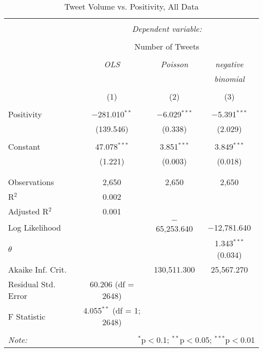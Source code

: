 \begin{table}[!htbp] \centering 
  \caption{Tweet Volume vs. Positivity, All Data} 
  \label{} 
    \begin{tabular}{@{\extracolsep{5pt}}lccc} 
    \\[-1.8ex]\hline 
    \hline \\[-1.8ex] 
     & \multicolumn{3}{c}{\textit{Dependent variable:}} \\ 
    \cline{2-4} 
    \\[-1.8ex] & \multicolumn{3}{c}{Number of Tweets} \\ 
    \\[-1.8ex] & \textit{OLS} & \textit{Poisson} & \textit{negative} \\ 
     & \textit{} & \textit{} & \textit{binomial} \\ 
    \\[-1.8ex] & (1) & (2) & (3)\\ 
    \hline \\[-1.8ex] 
     Positivity & $-$281.010$^{**}$ & $-$6.029$^{***}$ & $-$5.391$^{***}$ \\ 
      & (139.546) & (0.338) & (2.029) \\ 
      & & & \\ 
     Constant & 47.078$^{***}$ & 3.851$^{***}$ & 3.849$^{***}$ \\ 
      & (1.221) & (0.003) & (0.018) \\ 
      & & & \\ 
    \hline \\[-1.8ex] 
    Observations & 2,650 & 2,650 & 2,650 \\ 
    R$^{2}$ & 0.002 &  &  \\ 
    Adjusted R$^{2}$ & 0.001 &  &  \\ 
    Log Likelihood &  & $-$65,253.640 & $-$12,781.640 \\ 
    $\theta$ &  &  & 1.343$^{***}$  (0.034) \\ 
    Akaike Inf. Crit. &  & 130,511.300 & 25,567.270 \\ 
    Residual Std. Error & 60.206 (df = 2648) &  &  \\ 
    F Statistic & 4.055$^{**}$ (df = 1; 2648) &  &  \\ 
    \hline 
    \hline \\[-1.8ex] 
    \textit{Note:}  & \multicolumn{3}{r}{$^{*}$p$<$0.1; $^{**}$p$<$0.05; $^{***}$p$<$0.01} \\ 
    \end{tabular} 
\end{table} 
\newpage



